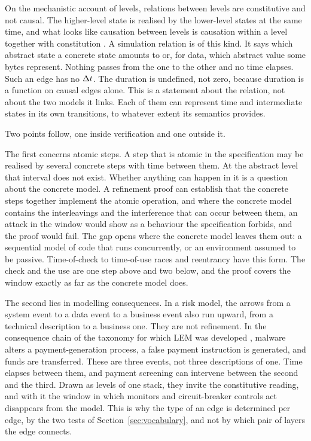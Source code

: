 On the mechanistic account of levels, relations between levels are constitutive and not
causal. The higher-level state is realised by the lower-level states at the same time,
and what looks like causation between levels is causation within a level together with
constitution \citep{craver2007}. A simulation relation is of this kind. It says which
abstract state a concrete state amounts to or, for data, which abstract value some bytes
represent. Nothing passes from the one to the other and no time elapses. Such an edge has
no $\Delta t$. The duration is undefined, not zero, because duration is a function on causal
edges alone. This is a statement about the relation, not about the two models it links.
Each of them can represent time and intermediate states in its own transitions, to
whatever extent its semantics provides.

Two points follow, one inside verification and one outside it.

The first concerns atomic steps. A step that is atomic in the specification may be
realised by several concrete steps with time between them. At the abstract level that
interval does not exist. Whether anything can happen in it is a question about the
concrete model. A refinement proof can establish that the concrete steps together
implement the atomic operation, and where the concrete model contains the interleavings
and the interference that can occur between them, an attack in the window would show as
a behaviour the specification forbids, and the proof would fail. The gap opens where the
concrete model leaves them out: a sequential model of code that runs concurrently, or an
environment assumed to be passive. Time-of-check to time-of-use races and reentrancy
have this form. The check and the use are one step above and two below, and the proof
covers the window exactly as far as the concrete model does.

The second lies in modelling consequences. In a risk model, the arrows from a system
event to a data event to a business event also run upward, from a technical description
to a business one. They are not refinement. In the consequence chain of the taxonomy for
which LEM was developed \citep{kreinztlctc}, malware alters a payment-generation process,
a false payment instruction is generated, and funds are transferred. These are three
events, not three descriptions of one. Time elapses between them, and payment screening
can intervene between the second and the third. Drawn as levels of one stack, they invite
the constitutive reading, and with it the window in which monitors and circuit-breaker
controls act disappears from the model. This is why the type of an edge is determined per
edge, by the two tests of Section~\ref{sec:vocabulary}, and not by which pair of layers
the edge connects.

